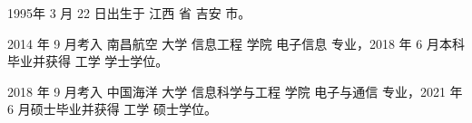 \begin{resume}


  1995年 3 月 22 日出生于 江西 省 吉安 市。

  2014 年 9 月考入 南昌航空 大学 信息工程 学院 电子信息 专业，2018 年 6 月本科毕业并获得 工学 学士学位。
  
  2018 年 9 月考入 中国海洋 大学 信息科学与工程 学院 电子与通信 专业，2021 年 6 月硕士毕业并获得 工学 硕士学位。


\end{resume}
